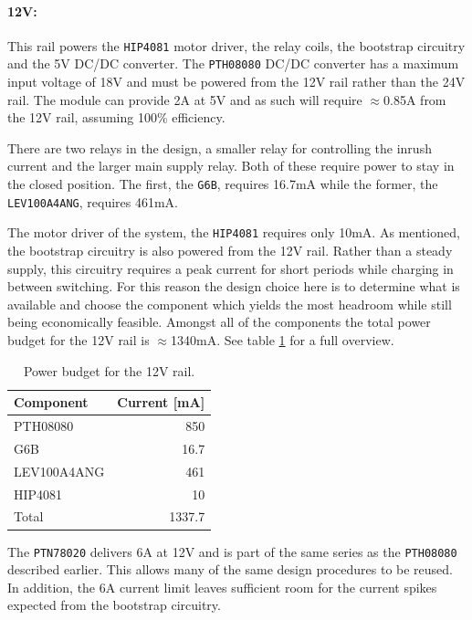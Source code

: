 \paragraph{12V:} %
\label{par:12v}
This rail powers the \texttt{HIP4081} motor driver, the relay coils, the bootstrap circuitry and the 5V DC/DC converter.
The \texttt{PTH08080} DC/DC converter has a maximum input voltage of 18V and must be powered from the 12V rail rather than the 24V rail.
The module can provide 2A at 5V and as such will require $\approx$0.85A from the 12V rail, assuming 100\% efficiency.

There are two relays in the design, a smaller relay for controlling the inrush current and the larger main supply relay.
Both of these require power to stay in the closed position.
The first, the \texttt{G6B}, requires 16.7mA while the former, the \texttt{LEV100A4ANG}, requires 461mA.

The motor driver of the system, the \texttt{HIP4081} requires only 10mA.
As mentioned, the bootstrap circuitry is also powered from the 12V rail.
Rather than a steady supply, this circuitry requires a peak current for short periods while charging in between switching.
For this reason the design choice here is to determine what is available and choose the component which yields the most headroom while still being economically feasible.
Amongst all of the components the total power budget for the 12V rail is $\approx$1340mA.
See table \ref{tab:12vpowerbudget} for a full overview.

\begin{table}
	\centering
	\begin{tabular}{l|r}
		 Component & Current [mA]\\
		 \hline
		 PTH08080 & 850\\
		 G6B & 16.7\\
		 LEV100A4ANG & 461\\
		 HIP4081 & 10\\
		 \hline
		 Total & 1337.7
	\end{tabular}
	\caption{Power budget for the 12V rail.}
	\label{tab:12vpowerbudget}
\end{table}

The \texttt{PTN78020} delivers 6A at 12V and is part of the same series as the \texttt{PTH08080} described earlier.
This allows many of the same design procedures to be reused.
In addition, the 6A current limit leaves sufficient room for the current spikes expected from the bootstrap circuitry.

